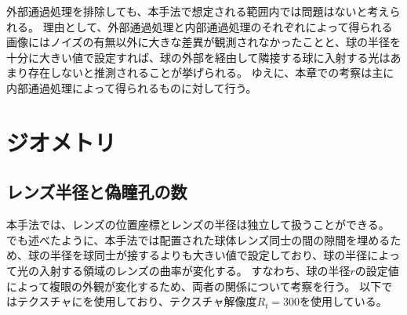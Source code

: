外部通過処理を排除しても、本手法で想定される範囲内では問題はないと考えられる。
理由として、外部通過処理と内部通過処理のそれぞれによって得られる画像にはノイズの有無以外に大きな差異が観測されなかったことと、球の半径を十分に大きい値で設定すれば、球の外部を経由して隣接する球に入射する光はあまり存在しないと推測されることが挙げられる。
ゆえに、本章での考察は主に内部通過処理によって得られるものに対して行う。


\section{ジオメトリ}
\label{S}

\subsection{レンズ半径と偽瞳孔の数}
\label{SS}

本手法では、レンズの位置座標とレンズの半径は独立して扱うことができる。
でも述べたように、本手法では配置された球体レンズ同士の間の隙間を埋めるため、球の半径を球同士が接するよりも大きい値で設定しており、球の半径によって光の入射する領域のレンズの曲率が変化する。
すなわち、球の半径$r$の設定値によって複眼の外観が変化するため、両者の関係について考察を行う。
以下ではテクスチャに\figref{}を使用しており、テクスチャ解像度$R_t = 300$を使用している。

